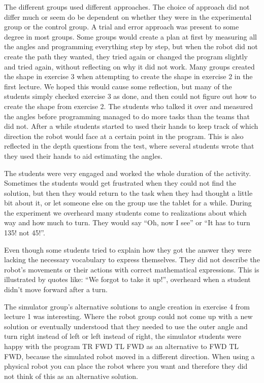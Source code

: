 \bigskip\noindent
The different groups used different approaches. The choice of approach did not differ much or seem do be dependent on whether they were in the experimental group or the control group. A trial and error approach was present to some degree in most groups. Some groups would create a plan at first by measuring all the angles and programming everything step by step, but when the robot did not create the path they wanted, they tried again or changed the program slightly and tried again, without reflecting on why it did not work. Many groups created the shape in exercise 3 when attempting to create the shape in exercise 2 in the first lecture. We hoped this would cause some reflection, but many of the students simply checked exercise 3 as done, and then could not figure out how to create the shape from exercise 2. The students who talked it over and measured the angles before programming managed to do more tasks than the teams that did not. After a while students started to used their hands to keep track of which direction the robot would face at a certain point in the program. This is also reflected in the depth questions from the test, where several students wrote that they used their hands to aid estimating the angles.

\bigskip\noindent
The students were very engaged and worked the whole duration of the activity. Sometimes the students would get frustrated when they could not find the solution, but then they would return to the task when they had thought a little bit about it, or let someone else on the group use the tablet for a while. During the experiment we overheard many students come to realizations about which way and how much to turn. They would say ``Oh, now I see'' or ``It has to turn 135! not 45!''. 

\bigskip\noindent
Even though some students tried to explain how they got the answer they were lacking the necessary vocabulary to express themselves. They did not describe the robot's movements or their actions with correct mathematical expressions. This is illustrated by quotes like: ``We forgot to take it up!'', overheard when a student didn't move forward after a turn. 

\bigskip\noindent
The simulator group's alternative solutions to angle creation in exercise 4 from lecture 1 was interesting. Where the robot group could not come up with a new solution or eventually understood that they needed to use the outer angle and turn right instead of left or left instead of right, the simulator students were happy with the program TR FWD TL FWD as an alternative to FWD TL FWD, because the simulated robot moved in a different direction. When using a physical robot you can place the robot where you want and therefore they did not think of this as an alternative solution.


